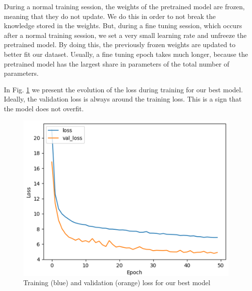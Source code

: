     During a normal training session, the weights of the pretrained model are frozen, meaning that they do not update. We do this in order to not break the knowledge stored in the weights. But, during a fine tuning session, which occurs after a normal training session, we set a very small learning rate and unfreeze the pretrained model. By doing this, the previously frozen weights are updated to better fit our dataset. Usually, a fine tuning epoch takes much longer, because the pretrained model has the largest share in parameters of the total number of parameters.

     In Fig. \ref{model_v42_loss} we present the evolution of the loss during training for our best model. Ideally, the validation loss is always around the training loss. This is a sign that the model does not overfit.
     
     \begin{figure}[b]
        \centering
        \includegraphics[scale=0.25]{images/model_v42_train.png}
        \caption{Training (blue) and validation (orange) loss for our best model}
        \label{model_v42_loss}
    \end{figure}